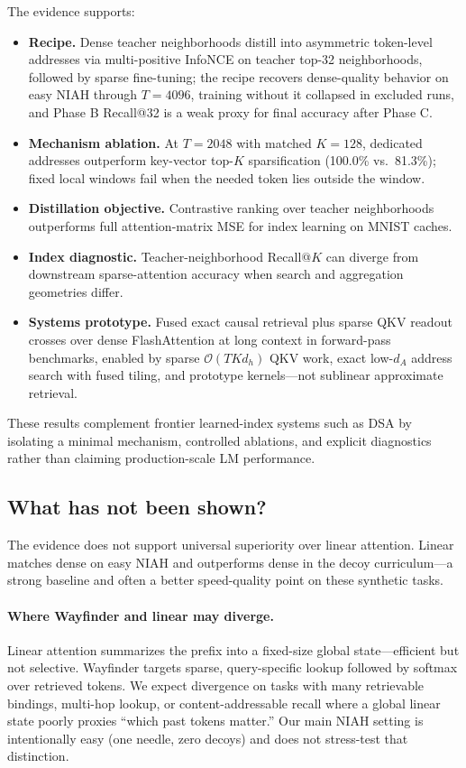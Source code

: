 \documentclass{article}
\begin{document}
The evidence supports:
\begin{itemize}
    \item \textbf{Recipe.} Dense teacher neighborhoods distill into asymmetric token-level addresses via multi-positive InfoNCE on teacher top-32 neighborhoods, followed by sparse fine-tuning; the recipe recovers dense-quality behavior on easy NIAH through $T{=}4096$, training without it collapsed in excluded runs, and Phase B Recall@32 is a weak proxy for final accuracy after Phase C.
    \item \textbf{Mechanism ablation.} At $T{=}2048$ with matched $K{=}128$, dedicated addresses outperform key-vector top-$K$ sparsification (100.0\% vs.\ 81.3\%); fixed local windows fail when the needed token lies outside the window.
    \item \textbf{Distillation objective.} Contrastive ranking over teacher neighborhoods outperforms full attention-matrix MSE for index learning on MNIST caches.
    \item \textbf{Index diagnostic.} Teacher-neighborhood Recall@$K$ can diverge from downstream sparse-attention accuracy when search and aggregation geometries differ.
    \item \textbf{Systems prototype.} Fused exact causal retrieval plus sparse QKV readout crosses over dense FlashAttention at long context in forward-pass benchmarks, enabled by sparse $\mathcal{O}(T K d_h)$ QKV work, exact low-$d_A$ address search with fused tiling, and prototype kernels---not sublinear approximate retrieval.
\end{itemize}
These results complement frontier learned-index systems such as DSA \cite{deepseek2025v32} by isolating a minimal mechanism, controlled ablations, and explicit diagnostics rather than claiming production-scale LM performance.

\subsection{What has not been shown?}

The evidence does not support universal superiority over linear attention. Linear matches dense on easy NIAH and outperforms dense in the decoy curriculum---a strong baseline and often a better speed-quality point on these synthetic tasks.

\paragraph{Where Wayfinder and linear may diverge.}
Linear attention summarizes the prefix into a fixed-size global state---efficient but not selective. Wayfinder targets sparse, query-specific lookup followed by softmax over retrieved tokens. We expect divergence on tasks with many retrievable bindings, multi-hop lookup, or content-addressable recall where a global linear state poorly proxies ``which past tokens matter.'' Our main NIAH setting is intentionally easy (one needle, zero decoys) and does not stress-test that distinction.
\end{document}
